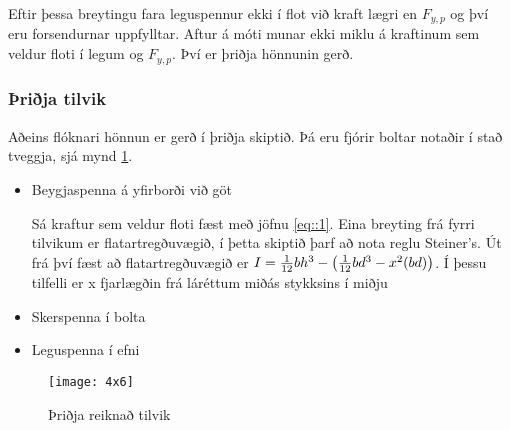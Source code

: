 Eftir þessa breytingu fara leguspennur ekki í flot við kraft lægri en $F_{y,p}$ og því eru forsendurnar uppfylltar. Aftur á móti munar ekki miklu á kraftinum sem veldur floti í legum og $F_{y,p}$. Því er þriðja hönnunin gerð.

\subsubsection{Þriðja tilvik}

Aðeins flóknari hönnun er gerð í þriðja skiptið. Þá eru fjórir boltar notaðir í stað tveggja, sjá mynd \ref{fig::4x6}.

\begin{itemize}
	\item Beygjaspenna á yfirborði við göt
	
	Sá kraftur sem veldur floti fæst með jöfnu \ref{eq::1}. Eina breyting frá fyrri tilvikum er flatartregðuvægið, í þetta skiptið þarf að nota reglu Steiner's. Út frá því fæst að flatartregðuvægið er $I = {1 \over 12}bh^3 -\left({1 \over 12}bd^3 - x^2(bd)\right)$. Í þessu tilfelli er x fjarlægðin frá láréttum miðás stykksins í miðju 
	
	\item Skerspenna í bolta
	\item Leguspenna í efni
\end{itemize}

\begin{figure}
	\centering
	\texttt{[image: 4x6]}
	\caption{Þriðja reiknað tilvik}
	\label{fig::4x6}
\end{figure}